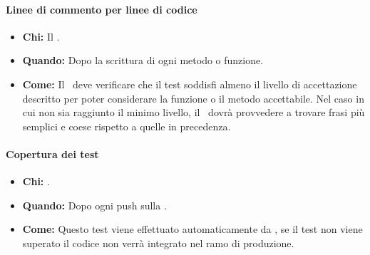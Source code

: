 \paragraph{Linee di commento per linee di codice}
\begin{itemize}
\item \textbf{Chi:} Il \Progr.
\item \textbf{Quando:} Dopo la scrittura di ogni metodo o funzione.
\item \textbf{Come:} Il \Progr\ deve verificare che il test soddisfi almeno il livello di accettazione descritto per poter considerare la funzione o il metodo accettabile. Nel caso in cui non sia raggiunto il minimo livello, il \Prog\ dovrà provvedere a trovare frasi più semplici e coese rispetto a quelle in precedenza. 
\end{itemize}

\paragraph{Copertura dei test}
\begin{itemize}
\item \textbf{Chi:} .
\item \textbf{Quando:} Dopo ogni push sulla .
\item \textbf{Come:} Questo test viene effettuato automaticamente da , se il test non viene superato il codice non verrà integrato nel ramo di produzione.
\end{itemize}